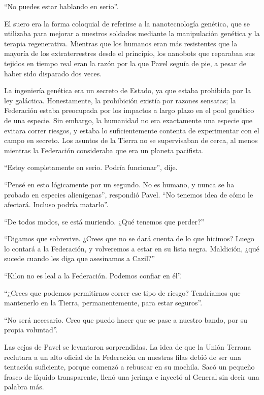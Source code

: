 \documentclass[spanish,12pt,a4paper,oneside,titlepage]{book}
\begin{document}
    ``No puedes estar hablando en serio''.

    El suero era la forma coloquial de referirse a la nanotecnología genética, que se utilizaba para mejorar a nuestros soldados mediante la manipulación genética y la terapia regenerativa. Mientras que los humanos eran más resistentes que la mayoría de los extraterrestres desde el principio, los nanobots que reparaban sus tejidos en tiempo real eran la razón por la que Pavel seguía de pie, a pesar de haber sido disparado dos veces.

    La ingeniería genética era un secreto de Estado, ya que estaba prohibida por la ley galáctica. Honestamente, la prohibición existía por razones sensatas; la Federación estaba preocupada por los impactos a largo plazo en el pool genético de una especie. Sin embargo, la humanidad no era exactamente una especie que evitara correr riesgos, y estaba lo suficientemente contenta de experimentar con el campo en secreto. Los asuntos de la Tierra no se supervisaban de cerca, al menos mientras la Federación consideraba que era un planeta pacifista.

    ``Estoy completamente en serio. Podría funcionar'', dije.

    ``Pensé en esto lógicamente por un segundo. No es humano, y nunca se ha probado en especies alienígenas'', respondió Pavel. ``No tenemos idea de cómo le afectará. Incluso podría matarlo''.

    ``De todos modos, se está muriendo. ¿Qué tenemos que perder?''

    ``Digamos que sobrevive. ¿Crees que no se dará cuenta de lo que hicimos? Luego lo contará a la Federación, y volveremos a estar en su lista negra. Maldición, ¿qué sucede cuando les diga que asesinamos a Cazil?''

    ``Kilon no es leal a la Federación. Podemos confiar en él''.

    ``¿Crees que podemos permitirnos correr ese tipo de riesgo? Tendríamos que mantenerlo en la Tierra, permanentemente, para estar seguros''.

    ``No será necesario. Creo que puedo hacer que se pase a nuestro bando, por su propia voluntad''.

    Las cejas de Pavel se levantaron sorprendidas. La idea de que la Unión Terrana reclutara a un alto oficial de la Federación en nuestras filas debió de ser una tentación suficiente, porque comenzó a rebuscar en su mochila. Sacó un pequeño frasco de líquido transparente, llenó una jeringa e inyectó al General sin decir una palabra más.
\end{document}
